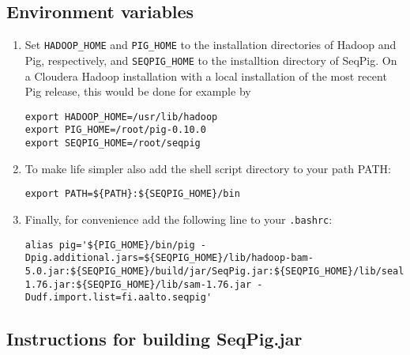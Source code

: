 \documentclass[a4paper,10pt,bibtotoc,abstracton,oneside,noindent,DIV15]{scrartcl}
\begin{document}
\subsection{Environment variables}
\begin{enumerate}
\item Set {\tt HADOOP\_HOME} and {\tt PIG\_HOME} to the installation
directories of Hadoop and Pig, respectively, and {\tt SEQPIG\_HOME} to
the installtion directory of SeqPig. On a Cloudera Hadoop installation
with a local installation of the most recent Pig release, this would be
done for example by
\begin{lstlisting} 
export HADOOP_HOME=/usr/lib/hadoop
export PIG_HOME=/root/pig-0.10.0
export SEQPIG_HOME=/root/seqpig 
\end{lstlisting}
%
\item To make life simpler also add the shell script directory to your path PATH:
%
\begin{lstlisting} 
export PATH=${PATH}:${SEQPIG_HOME}/bin
\end{lstlisting}
%
\item Finally, for convenience add the following line to your {\tt .bashrc}:
%
\begin{lstlisting} 
alias pig='${PIG_HOME}/bin/pig -Dpig.additional.jars=${SEQPIG_HOME}/lib/hadoop-bam-5.0.jar:${SEQPIG_HOME}/build/jar/SeqPig.jar:${SEQPIG_HOME}/lib/seal.jar:${SEQPIG_HOME}/lib/picard-1.76.jar:${SEQPIG_HOME}/lib/sam-1.76.jar -Dudf.import.list=fi.aalto.seqpig' 
\end{lstlisting}
%
\end{enumerate}

\subsection{Instructions for building SeqPig.jar}
\end{document}
